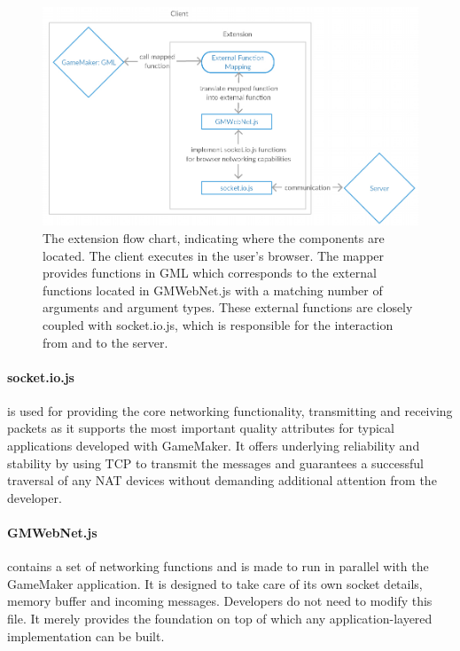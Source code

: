 \documentclass[bsc,frontabs,twoside,singlespacing,parskip,deptreport]{infthesis}     %
\begin{document}
\begin{figure}[H]
\includegraphics[scale=0.50]{images/extension_flow.jpg}
\caption{The extension flow chart, indicating where the components are located. The client executes in the user's browser. The mapper provides functions in GML which corresponds to the external functions located in GMWebNet.js with a matching number of arguments and argument types. These external functions are closely coupled with socket.io.js, which is responsible for the interaction from and to the server.}
\label{fig:extension_flow}
\vspace{1em}
\end{figure}


\paragraph*{socket.io.js}
is used for providing the core networking functionality, transmitting and receiving packets as it supports the most important quality attributes for typical applications developed with GameMaker. It offers underlying reliability and stability by using TCP to transmit the messages and guarantees a successful traversal of any NAT devices without demanding additional attention from the developer.

\paragraph*{GMWebNet.js}
contains a set of networking functions and is made to run in parallel with the GameMaker application. 
It is designed to take care of its own socket details, memory buffer and incoming messages. Developers do not need to modify this file. It merely provides the foundation on top of which any application-layered implementation can be built.
\end{document}
